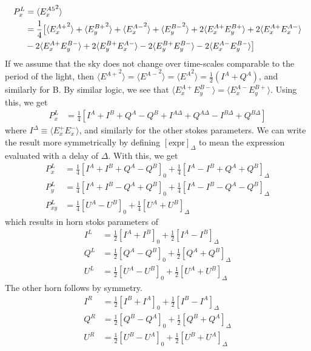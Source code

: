 \documentclass{article}
\begin{document}
\begin{align}
	P^L_x &= \langle {E^{A5}_x}^2\rangle \notag \\
		&= \frac14\big[
			\langle {E^{A+}_x}^2\rangle
			+ \langle {E^{B+}_y}^2\rangle
			+ \langle {E^{A-}_x}^2\rangle
			+ \langle {E^{B-}_y}^2\rangle
			+ 2\langle E^{A+}_xE^{B+}_y\rangle
			+ 2\langle E^{A+}_xE^{A-}_x\rangle \notag \\
			&- 2\langle E^{A+}_xE^{B-}_y\rangle
			+ 2\langle E^{B+}_yE^{A-}_x\rangle
			- 2\langle E^{B+}_yE^{B-}_y\rangle
			- 2\langle E^{A-}_xE^{B-}_y\rangle
			\big]
\end{align}
If we assume that the sky does not change over time-scales
comparable to the period of the light, then $\langle {E^{A+}}^2\rangle
= \langle {E^{A-}}^2\rangle = \langle {E^A}^2\rangle = \frac12(I^A+Q^A)$,
and similarly for B. By similar logic, we see that $\langle E^{A+}_xE^{B-}_y\rangle = \langle E^{A-}_xE^{B+}_y\rangle$. Using this, we get
\begin{align}
	P^L_x &= \frac14 [I^A+I^B+Q^A-Q^B + I^{A\Delta}+Q^{A\Delta}-I^{B\Delta}+Q^{B\Delta}]
\end{align}
where $I^\Delta \equiv \langle E^+_xE^-_x\rangle$, and similarly for the
other stokes parameters. We can write the result more symmetrically by
defining $[\textrm{expr}]_\Delta$ to mean the expression evaluated with
a delay of $\Delta$. With this, we get
\begin{align}
	P^L_x &= \frac14 [I^A+I^B+Q^A-Q^B]_0 + \frac14[I^A-I^B+Q^A+Q^B]_\Delta \\
	P^L_y &= \frac14 [I^A+I^B-Q^A+Q^B]_0 + \frac14[I^A-I^B-Q^A-Q^B]_\Delta \\
	P^L_{xy} &= \frac14 [U^A-U^B]_0 + \frac14[U^A+U^B]_\Delta
\end{align}
which results in horn stoks parameters of
\begin{align}
	I^L &= \frac12 [I^A+I^B]_0 + \frac12[I^A-I^B]_\Delta \\
	Q^L &= \frac12 [Q^A-Q^B]_0 + \frac12[Q^A+Q^B]_\Delta \\
	U^L &= \frac12 [U^A-U^B]_0 + \frac12[U^A+U^B]_\Delta
\end{align}
The other horn follows by symmetry.
\begin{align}
	I^R &= \frac12 [I^B+I^A]_0 + \frac12[I^B-I^A]_\Delta \\
	Q^R &= \frac12 [Q^B-Q^A]_0 + \frac12[Q^B+Q^A]_\Delta \\
	U^R &= \frac12 [U^B-U^A]_0 + \frac12[U^B+U^A]_\Delta
\end{align}
\end{document}
